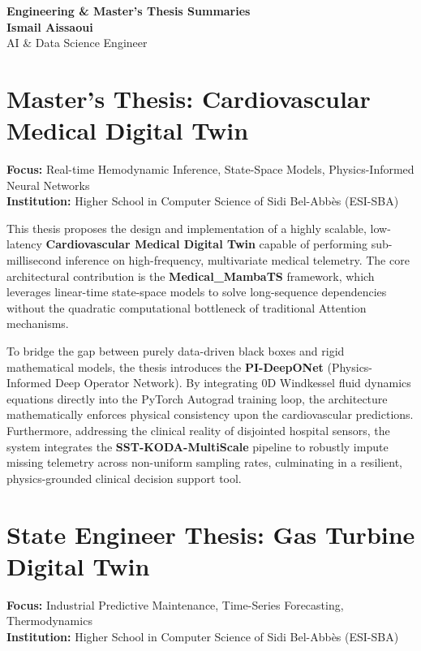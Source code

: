 \documentclass[11pt, a4paper]{article}
\begin{document}
\begin{center}
    \LARGE \textbf{Engineering \& Master's Thesis Summaries} \\
    \vspace{0.2cm}
    \large \textbf{Ismail Aissaoui} \\
    \vspace{0.1cm}
    \normalsize AI \& Data Science Engineer \\
\end{center}

\vspace{0.5cm}

\section*{Master's Thesis: Cardiovascular Medical Digital Twin}
\textbf{Focus:} Real-time Hemodynamic Inference, State-Space Models, Physics-Informed Neural Networks \\
\textbf{Institution:} Higher School in Computer Science of Sidi Bel-Abbès (ESI-SBA)

This thesis proposes the design and implementation of a highly scalable, low-latency \textbf{Cardiovascular Medical Digital Twin} capable of performing sub-millisecond inference on high-frequency, multivariate medical telemetry. The core architectural contribution is the \textbf{Medical\_MambaTS} framework, which leverages linear-time state-space models to solve long-sequence dependencies without the quadratic computational bottleneck of traditional Attention mechanisms.

To bridge the gap between purely data-driven black boxes and rigid mathematical models, the thesis introduces the \textbf{PI-DeepONet} (Physics-Informed Deep Operator Network). By integrating 0D Windkessel fluid dynamics equations directly into the PyTorch Autograd training loop, the architecture mathematically enforces physical consistency upon the cardiovascular predictions. Furthermore, addressing the clinical reality of disjointed hospital sensors, the system integrates the \textbf{SST-KODA-MultiScale} pipeline to robustly impute missing telemetry across non-uniform sampling rates, culminating in a resilient, physics-grounded clinical decision support tool.

\vspace{0.8cm}

\section*{State Engineer Thesis: Gas Turbine Digital Twin}
\textbf{Focus:} Industrial Predictive Maintenance, Time-Series Forecasting, Thermodynamics \\
\textbf{Institution:} Higher School in Computer Science of Sidi Bel-Abbès (ESI-SBA)
\end{document}
